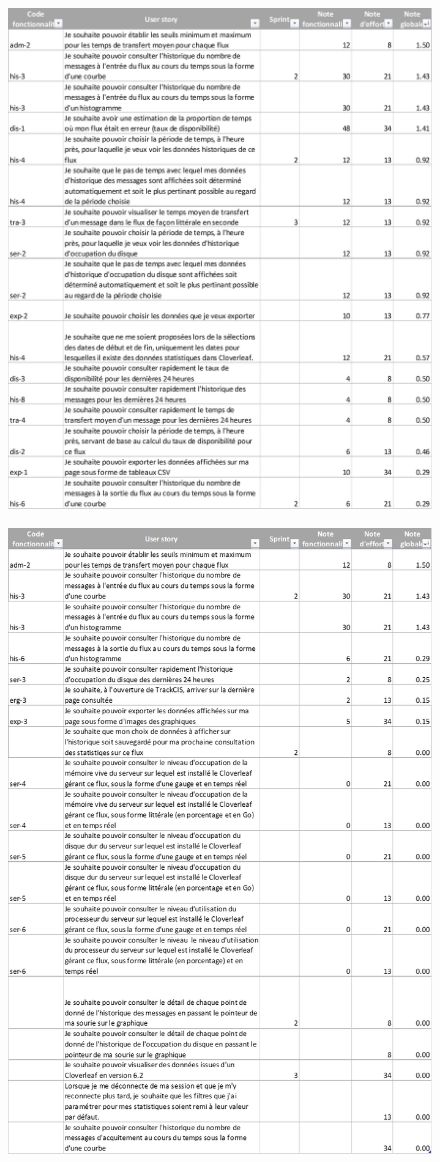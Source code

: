 	\begin{figure}[H]
		\centering
		\includegraphics[width=17cm]{../img/annexes/backlog_2.png}
	\end{figure}
	\begin{figure}[H]
		\centering
		\includegraphics[width=17cm]{../img/annexes/backlog_3.png}
	\end{figure}